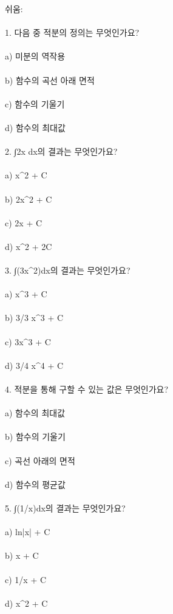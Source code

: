\documentclass[fleqn]{article}
\begin{document}
      
        쉬움: \\\\
1. 다음 중 적분의 정의는 무엇인가요? \\\\
   a) 미분의 역작용 \\\\
   b) 함수의 곡선 아래 면적 \\\\
   c) 함수의 기울기 \\\\
   d) 함수의 최대값 \\\\

2. ∫2x dx의 결과는 무엇인가요? \\\\
   a) x^2 + C \\\\
   b) 2x^2 + C \\\\
   c) 2x + C \\\\
   d) x^2 + 2C \\\\

3. ∫(3x^2)dx의 결과는 무엇인가요? \\\\
   a) x^3 + C \\\\
   b) 3/3 x^3 + C \\\\
   c) 3x^3 + C \\\\
   d) 3/4 x^4 + C \\\\

4. 적분을 통해 구할 수 있는 값은 무엇인가요? \\\\
   a) 함수의 최대값 \\\\
   b) 함수의 기울기 \\\\
   c) 곡선 아래의 면적 \\\\
   d) 함수의 평균값 \\\\

5. ∫(1/x)dx의 결과는 무엇인가요? \\\\
   a) ln|x| + C \\\\
   b) x + C \\\\
   c) 1/x + C \\\\
   d) x^2 + C \\\\
\end{document}

